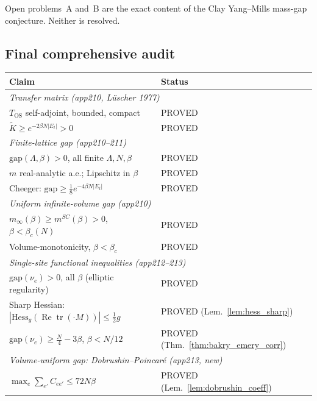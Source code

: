 \medskip\noindent Open problems~A and~B are the exact content of the
Clay Yang--Mills mass-gap conjecture.  Neither is resolved.

\subsection{Final comprehensive audit}
\label{ssec:final_audit}

\begin{center}
\renewcommand{\arraystretch}{1.12}
\begin{tabular}{p{8.5cm}|l}
\hline
\textbf{Claim} & \textbf{Status}\\
\hline
\multicolumn{2}{l}{\textit{Transfer matrix (app210, L\"uscher 1977)}}\\
$T_{\mathrm{OS}}$ self-adjoint, bounded, compact & PROVED\\
$\tilde K\ge e^{-2\beta N|E_t|}>0$ & PROVED\\
\hline
\multicolumn{2}{l}{\textit{Finite-lattice gap (app210--211)}}\\
$\mathrm{gap}(\Lambda,\beta)>0$, all finite $\Lambda,N,\beta$ & PROVED\\
$m$ real-analytic a.e.; Lipschitz in $\beta$ & PROVED\\
Cheeger: $\mathrm{gap}\ge\tfrac{1}{8}e^{-4\beta N|E_t|}$ & PROVED\\
\hline
\multicolumn{2}{l}{\textit{Uniform infinite-volume gap (app210)}}\\
$m_{\infty}(\beta)\ge m^{SC}(\beta)>0$, $\beta<\beta_c(N)$ & PROVED\\
Volume-monotonicity, $\beta<\beta_c$ & PROVED\\
\hline
\multicolumn{2}{l}{\textit{Single-site functional inequalities (app212--213)}}\\
$\mathrm{gap}(\nu_e)>0$, all $\beta$ (elliptic regularity) & PROVED\\
Sharp Hessian: $|\mathrm{Hess}_g(\operatorname{Re}\operatorname{tr}(\cdot M))|\le\tfrac{1}{2}g$ & PROVED (Lem.~\ref{lem:hess_sharp})\\
$\mathrm{gap}(\nu_e)\ge\tfrac{N}{4}-3\beta$, $\beta<N/12$ & PROVED (Thm.~\ref{thm:bakry_emery_corr})\\
\hline
\multicolumn{2}{l}{\textit{Volume-uniform gap: Dobrushin--Poincar\'{e} (app213, new)}}\\
$\max_e\sum_{e'}C_{ee'}\le 72N\beta$ & PROVED (Lem.~\ref{lem:dobrushin_coeff})\\

\end{tabular}
\end{center}
